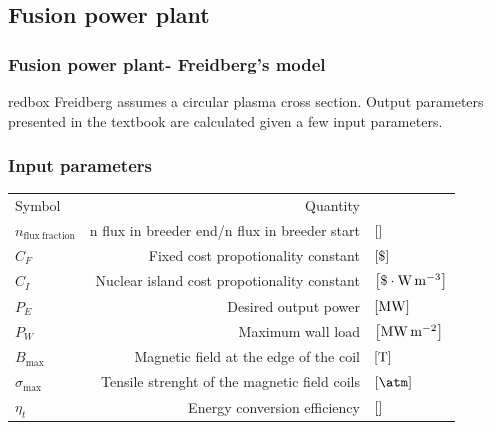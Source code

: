 \documentclass[hyperref={colorlinks=true,urlcolor=blue,linkcolor=.},aspectratio=1610,mathserif]{beamer}
\begin{document}
\subsection{Fusion power plant}
\begin{frame}
	\frametitle{Fusion power plant- Freidberg's model}
	\centering
	\begin{beamercolorbox}[sep=1em,wd=8cm]{redbox}
		Freidberg assumes a circular plasma cross section. Output parameters presented in the textbook are calculated given a few input parameters.
	\end{beamercolorbox}
\end{frame}
\begin{frame}
	\frametitle{Input parameters}
	\centering
	\begin{table}
		\begin{tabular}{lrl}
			Symbol                         & Quantity                                      &                                              \\
			\(n_\mathrm{flux \ fraction}\) & n flux in breeder end/n flux in breeder start & \(\bqty{}\)                                  \\
			\(C_F\)                        & Fixed cost propotionality constant            & \(\bqty{\$}\)                                \\
			\(C_I\)                        & Nuclear island cost propotionality constant   & \(\bqty{\$\cdot\si{\watt\per\meter\cubed}}\) \\
			\(P_E\)                        & Desired output power                          & \(\bqty{\si{\mega\watt}}\)                   \\
			\(P_W\)                        & Maximum wall load                             & \(\bqty{\si{\mega\watt\per\meter\squared}}\) \\
			\(B_{\max}\)                   & Magnetic field at the edge of the coil        & \(\bqty{\si{\tesla}}\)                       \\
			\(\sigma_{\max}\)              & Tensile strenght of the magnetic field coils  & \(\bqty{\si{\atm}}\)                         \\
			\(\eta_t\)                     & Energy conversion efficiency                  & \(\bqty{}\)                                  \\
		\end{tabular}
	\end{table}
\end{frame}
\end{document}
